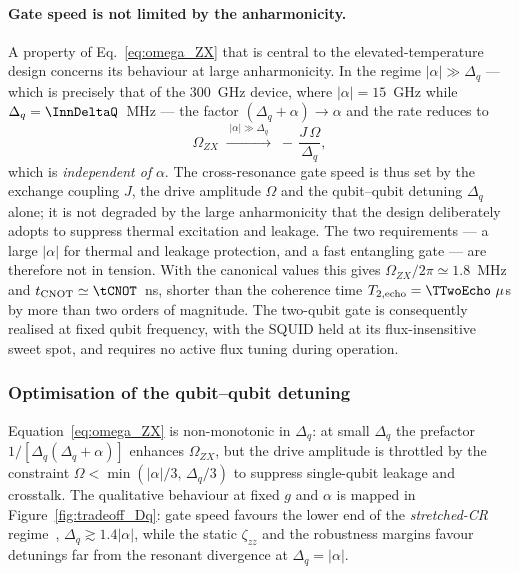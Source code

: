 \paragraph{Gate speed is not limited by the anharmonicity.}
A property of Eq.~\eqref{eq:omega_ZX} that is central to the elevated-temperature
design concerns its behaviour at large anharmonicity. In the regime
$|\alpha| \gg \Delta_q$ --- which is precisely that of the $300$~GHz device,
where $|\alpha| = 15$~GHz while $\Delta_q = \InnDeltaQ$~MHz --- the factor
$(\Delta_q + \alpha) \to \alpha$ and the rate reduces to
\begin{equation}
\Omega_{ZX} \;\xrightarrow{\;|\alpha|\gg\Delta_q\;}\;
-\,\frac{J\,\Omega}{\Delta_q},
\label{eq:omega_ZX_largealpha}
\end{equation}
which is \emph{independent of} $\alpha$. The cross-resonance gate speed is thus
set by the exchange coupling $J$, the drive amplitude $\Omega$ and the
qubit--qubit detuning $\Delta_q$ alone; it is not degraded by the large
anharmonicity that the design deliberately adopts to suppress thermal excitation
and leakage. The two requirements --- a large $|\alpha|$ for thermal and leakage
protection, and a fast entangling gate --- are therefore not in tension. With
the canonical values this gives $\Omega_{ZX}/2\pi \simeq 1.8$~MHz and
$t_{\mathrm{CNOT}} \simeq \tCNOT$~ns, shorter than the coherence time
$T_{2,\mathrm{echo}} = \TTwoEcho~\mu$s by more than two orders of magnitude. The
two-qubit gate is consequently realised at fixed qubit frequency, with the
SQUID held at its flux-insensitive sweet spot, and requires no active flux
tuning during operation.

\subsubsection{Optimisation of the qubit--qubit detuning}
\label{subsec:dq_optimization}

Equation~\eqref{eq:omega_ZX} is non-monotonic in $\Delta_q$: at small
$\Delta_q$ the prefactor $1/[\Delta_q(\Delta_q+\alpha)]$ enhances $\Omega_{ZX}$,
but the drive amplitude is throttled by the constraint
$\Omega < \min(|\alpha|/3,\,\Delta_q/3)$ to suppress single-qubit leakage and
crosstalk. The qualitative behaviour at fixed $g$ and $\alpha$ is mapped in
Figure~\ref{fig:tradeoff_Dq}: gate speed favours the lower end of the
\emph{stretched-CR} regime~\cite{Sheldon2016}, $\Delta_q \gtrsim 1.4|\alpha|$,
while the static $\zeta_{zz}$ and the robustness margins favour detunings far
from the resonant divergence at $\Delta_q = |\alpha|$.

